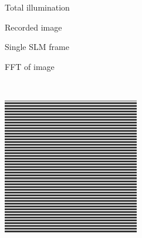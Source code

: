 \begin{figure}[h]
  \centering
  \begin{subfigure}[t]{0.23\textwidth}
      \centering
      Total illumination
  \end{subfigure}\hfill
  \begin{subfigure}[t]{0.23\textwidth}
      \centering
      Recorded image
  \end{subfigure}\hfill
  \begin{subfigure}[t]{0.23\textwidth}
      \centering
      Single SLM frame
  \end{subfigure}\hfill
  \begin{subfigure}[t]{0.23\textwidth}
      \centering
      \gls{FFT} of image
  \end{subfigure}\\
  \begin{subfigure}[t]{0.23\textwidth}
      \centering
      \includegraphics[width=\textwidth]{sim_slit/1/vert_pattern}

\end{subfigure}
\end{figure}
